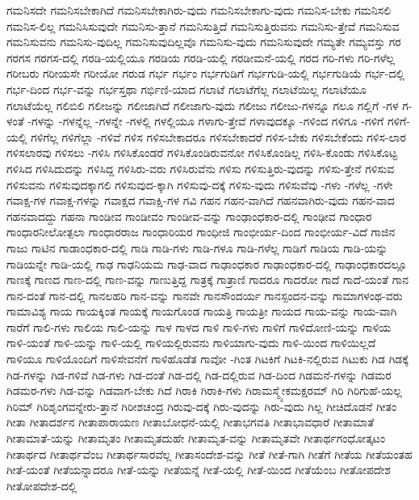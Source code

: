 {ಗಮನಿಸದೇ
ಗಮನಿಸಬೇಕಾಗಿದೆ
ಗಮನಿಸಬೇಕಾಗಿರು-ವುದು
ಗಮನಿಸಬೇಕಾಗು-ವುದು
ಗಮನಿಸ-ಬೇಕು
ಗಮನಿಸಲಿ
ಗಮನಿಸ-ಲಿಲ್ಲ
ಗಮನಿಸಿಸುವುದೇ
ಗಮನಿಸು-ತ್ತಾನೆ
ಗಮನಿಸುತ್ತಿದೆ
ಗಮನಿಸುತ್ತಿರುವನು
ಗಮನಿಸು-ತ್ತೇವೆ
ಗಮನಿಸುವ
ಗಮನಿಸುವನು
ಗಮನಿಸು-ವುದಿಲ್ಲ
ಗಮನಿಸುವುದಿಲ್ಲವೊ
ಗಮನಿಸು-ವುದು
ಗಮನಿಸುವುದೇ
ಗಮ್ಯತೇ
ಗಮ್ಯವಸ್ತು
ಗರ
ಗರಗಸ
ಗರಗಸ-ದಲ್ಲಿ
ಗರಡಿ-ಯಲ್ಲಿಯೂ
ಗರಡಿಯ
ಗರಡಿ-ಯಲ್ಲಿ
ಗರಡೀಮನೆ-ಯಲ್ಲಿ
ಗರದ
ಗರಿ-ಗಳು
ಗರಿ-ಗಳೆಲ್ಲ
ಗರೀಬರು
ಗರೀಯಸೇ
ಗರೀಯೋ
ಗರುಡ
ಗರ್ಭ
ಗರ್ಭಂ
ಗರ್ಭಗುಡಿಗೆ
ಗರ್ಭಗುಡಿ-ಯಲ್ಲಿ
ಗರ್ಭಗುಡಿಯೆ
ಗರ್ಭ-ದಲ್ಲಿ
ಗರ್ಭ-ದಿಂದ
ಗರ್ಭ-ವನ್ನು
ಗರ್ಭಸ್ತಥಾ
ಗರ್ಭಿಣಿ-ಯಾದ
ಗಲಾಟೆ
ಗಲಾಟೆಗೆಲ್ಲ
ಗಲಾಟೆಯಿಲ್ಲ
ಗಲಾಟೆಯೂ
ಗಲಾಟೆಯೆಲ್ಲ
ಗಲಿಬಿಲಿ
ಗಲೀಜನ್ನು
ಗಲೀಜಾಗಿದೆ
ಗಲೀಜಾಗು-ವುದು
ಗಲೀಜು
ಗಲೀಜು-ಗಳನ್ನೂ
ಗಲೂ
ಗಲ್ಲಿಗೆ
-ಗಳ
ಗ-ಳಂತೆ
-ಗಳನ್ನು
-ಗಳನ್ನೆಲ್ಲ
-ಗಳನ್ನೇ
-ಗಳಲ್ಲಿ
ಗಳಲ್ಲಿಯೂ
ಗಳಾಗು-ತ್ತೇವೆ
ಗಳಾವುದಕ್ಕೂ
-ಗಳಿಂದ
ಗಳಿಗೂ
-ಗಳಿಗೆ
ಗಳಿಗೆ-ಯಲ್ಲಿ
ಗಳಿಗೆಲ್ಲ
ಗಳಿಗೆಲ್ಲಾ
-ಗಳಿವೆ
ಗಳಿಸ
ಗಳಿಸಬೇಕಾದರೂ
ಗಳಿಸಬೇಕಾದರೆ
ಗಳಿಸ-ಬೇಕು
ಗಳಿಸಬೇಕೆಂದು
ಗಳಿಸ-ಲಾರ
ಗಳಿಸಲಾರವು
ಗಳಿಸಲು
-ಗಳಿಸಿ
ಗಳಿಸಿಕೊಂಡರೆ
ಗಳಿಸಿಕೊಂಡಿರುವನೋ
ಗಳಿಸಿಕೊಂಡಿಲ್ಲ
ಗಳಿಸಿ-ಕೊಂಡು
ಗಳಿಸಿಕೊಟ್ಟ
ಗಳಿಸಿದ
ಗಳಿಸಿದುದನ್ನು
ಗಳಿಸಿದ್ದ
ಗಳಿಸಿರು-ವರು
ಗಳಿಸಿರುವೆನು
ಗಳಿಸು
ಗಳಿಸುತ್ತಿರು-ವುದನ್ನು
ಗಳಿಸು-ತ್ತೇನೆ
ಗಳಿಸುವ
ಗಳಿಸುವನು
ಗಳಿಸುವುದಕ್ಕಾಗಲಿ
ಗಳಿಸುವುದ-ಕ್ಕಾಗಿ
ಗಳಿಸುವು-ದಕ್ಕೆ
ಗಳಿಸು-ವುದು
ಗಳಿಸುವೆವು
-ಗಳು
-ಗಳೆಲ್ಲ
-ಗಳೇ
ಗವಾಕ್ಷ-ಗಳ
ಗವಾಕ್ಷ-ಗಳನ್ನು
ಗವಾಕ್ಷದ
ಗವಾಕ್ಷಿ-ಗಳ
ಗವಿ
ಗಹನ
ಗಹನ-ವಾಗಿದೆ
ಗಹನವಾಗಿರು-ವುದು
ಗಹನ-ವಾದ
ಗಹನವಾದದ್ದು
ಗಹನಾ
ಗಾಂಡೀವ
ಗಾಂಡೀವಂ
ಗಾಂಡೀವ-ವನ್ನು
ಗಾಂಢಾಂಧಕಾರ-ದಲ್ಲಿ
ಗಾಂಢೀವ
ಗಾಂಧಾರ
ಗಾಂಧಾರನೀಲೋತ್ಪಲಾ
ಗಾಂಧಾರರಾಜ
ಗಾಂಧಾರಿಯರ
ಗಾಂಧೀಜಿ
ಗಾಂಭೀರ್ಯ-ದಿಂದ
ಗಾಂಭೀರ್ಯ-ವಿದೆ
ಗಾಜಿನ
ಗಾಜು
ಗಾಟಿನ
ಗಾಡಾಂಧಕಾರ-ದಲ್ಲಿ
ಗಾಡಿ
ಗಾಡಿ-ಗಳು
ಗಾಡಿ-ಗಳೂ
ಗಾಡಿ-ಗಳೆಲ್ಲ
ಗಾಡಿಗೆ
ಗಾಡಿಯ
ಗಾಡಿ-ಯನ್ನು
ಗಾಡಿಯನ್ನೇ
ಗಾಡಿ-ಯಲ್ಲಿ
ಗಾಢ
ಗಾಢನಿಯಮ
ಗಾಢ-ವಾದ
ಗಾಢಾಂಧಕಾರ
ಗಾಢಾಂಧಕಾರ-ದಲ್ಲಿ
ಗಾಢಾಂಧಕಾರದಲ್ಲೂ
ಗಾಣಕ್ಕೆ
ಗಾಣದ
ಗಾಣ-ದಲ್ಲಿ
ಗಾಣ-ವನ್ನು
ಗಾಣುತ್ತಿದ್ದ
ಗಾತ್ರಕ್ಕೆ
ಗಾತ್ರಾಣಿ
ಗಾದರೂ
ಗಾದರೋ
ಗಾದೆ
ಗಾದೆ-ಯಂತೆ
ಗಾನ
ಗಾನ-ದಂತೆ
ಗಾನ-ದಲ್ಲಿ
ಗಾನಲಹರಿ
ಗಾನ-ವನ್ನು
ಗಾನವೇ
ಗಾನಸೌಂದರ್ಯ
ಗಾನಸ್ಪಂದನ-ವನ್ನು
ಗಾಮಾಗಳಂಥ-ವರು
ಗಾಮಾವಿಶ್ಯ
ಗಾಯ
ಗಾಯಕ್ಕಿಂತ
ಗಾಯಕ್ಕೆ
ಗಾಯಗೊಂಡ
ಗಾಯತ್ರಿ
ಗಾಯತ್ರೀ
ಗಾಯದ
ಗಾಯ-ವನ್ನು
ಗಾಯ-ವಾಗಿ
ಗಾರೆಗೆ
ಗಾಲಿ-ಗಳು
ಗಾಲಿಯ
ಗಾಲಿ-ಯನ್ನು
ಗಾಳ
ಗಾಳದ
ಗಾಳಿ
ಗಾಳಿ-ಗಳು
ಗಾಳಿಗೆ
ಗಾಳಿದೋಣಿ-ಯನ್ನು
ಗಾಳಿಯ
ಗಾಳಿ-ಯಂತೆ
ಗಾಳಿ-ಯನ್ನು
ಗಾಳಿ-ಯಲ್ಲಿ
ಗಾಳಿಯಲ್ಲಿರುವನು
ಗಾಳಿಯಾಗು-ವುದು
ಗಾಳಿ-ಯಿಂದ
ಗಾಳಿಯಿಲ್ಲದೆ
ಗಾಳಿಯೂ
ಗಾಳಿಯೊಂದಿಗೆ
ಗಾಳಿಸೇವನೆಗೆ
ಗಾಳಿಹೊಡೆತ
ಗಾವೋ
-ಗಿಂತ
ಗಿಟಕಿಗೆ
ಗಿಟಕಿ-ನಲ್ಲಿರುವ
ಗಿಟುಕು
ಗಿಡ
ಗಿಡಕ್ಕೆ
ಗಿಡ-ಗಳನ್ನು
ಗಿಡ-ಗಳಿವೆ
ಗಿಡ-ಗಳು
ಗಿಡ-ದಂತೆ
ಗಿಡ-ದಲ್ಲಿ
ಗಿಡ-ದಲ್ಲಿರುವ
ಗಿಡ-ದಿಂದ
ಗಿಡಮನೆ-ಗಳನ್ನು
ಗಿಡಮರ
ಗಿಡಮರ-ಗಳು
ಗಿಡ-ವನ್ನು
ಗಿಡವಾಗ-ಬೇಕು
ಗಿದೆ
ಗಿರಾಕಿ
ಗಿರಾಕಿ-ಗಳು
ಗಿರಾಮಸ್ಮ್ಯೇಕಮಕ್ಷರಮ್
ಗಿರಿ
ಗಿರಿಗುಹೆ-ಯಲ್ಲ
ಗಿರಿಮ್
ಗಿರಿಶೃಂಗವನ್ನೇರು-ತ್ತಾನೆ
ಗಿರೀಶಚಂದ್ರ
ಗಿರುವು-ದಕ್ಕೆ
ಗಿರು-ವುದನ್ನು
ಗಿರು-ವುದು
ಗಿಲ್ಲ
ಗೀಚಿದೊಡನೆ
ಗೀತಂ
ಗೀತಾ
ಗೀತಾದರ್ಶನ
ಗೀತಾಪಾರಾಯಣ
ಗೀತಾಬೋಧನೆ-ಯಲ್ಲಿ
ಗೀತಾಭಗವತಿ
ಗೀತಾಭಾವಧಾರೆ
ಗೀತಾಮಾತೆ
ಗೀತಾಮಾತೆ-ಯನ್ನು
ಗೀತಾಮೃತಂ
ಗೀತಾಮೃತದುಹೇ
ಗೀತಾಮೃತ-ವನ್ನು
ಗೀತಾಮೃತವೇ
ಗೀತಾರ್ಥಗಂಧೋತ್ಕಟಂ
ಗೀತಾರ್ಥದ
ಗೀತಾರ್ಥವೆಂಬ
ಗೀತಾರ್ಥಸಾರವೆಲ್ಲ
ಗೀತಾಸಂದೇಶ-ವನ್ನು
ಗೀತೆ
ಗೀತೆ-ಗಾಗಿ
ಗೀತೆಗೆ
ಗೀತೆಯ
ಗೀತೆಯಂತಹ
ಗೀತೆ-ಯಂತೆ
ಗೀತೆಯನ್ನಾದರೂ
ಗೀತೆ-ಯನ್ನು
ಗೀತೆಯನ್ನೆ
ಗೀತೆ-ಯಲ್ಲಿ
ಗೀತೆ-ಯಿಂದ
ಗೀತೆಯೆಂಬ
ಗೀತೋಪದೇಶ
ಗೀತೋಪದೇಶ-ದಲ್ಲಿ
}
